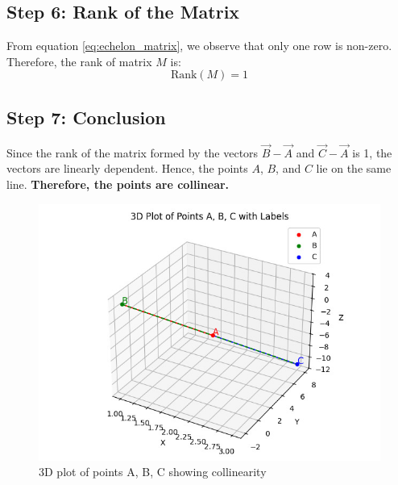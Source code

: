 \documentclass[journal]{IEEEtran}
\begin{document}
\subsection*{Step 6: Rank of the Matrix}
From equation \eqref{eq:echelon_matrix}, we observe that only one row is non-zero. Therefore, the rank of matrix $M$ is:
\begin{equation}
\text{Rank}(M) = 1
\label{eq:rank}
\end{equation}

\subsection*{Step 7: Conclusion}
Since the rank of the matrix formed by the vectors $\vec{B} - \vec{A}$ and $\vec{C} - \vec{A}$ is 1, the vectors are linearly dependent.  
Hence, the points $A$, $B$, and $C$ lie on the same line.  
\textbf{Therefore, the points are collinear.}

\newpage
\begin{figure}[h!]
   \centering
   \includegraphics[width=1\linewidth]{figs/fig1.png}
   \caption{3D plot of points A, B, C showing collinearity}
   \label{}
\end{figure}
\end{document}
